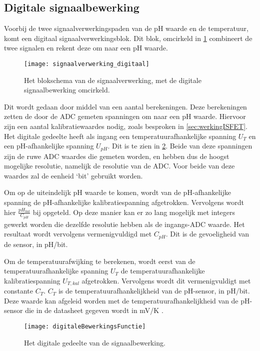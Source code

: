 \subsection{Digitale signaalbewerking}\label{sec:digitaal}

Voorbij de twee signaalverwerkingspaden van de pH waarde en de temperatuur, komt een digitaal signaalverwerkingsblok. Dit blok, omcirkeld in \cref{fig:digitaalInSchema}  combineert de twee signalen en rekent deze om naar een pH waarde.
\begin{figure}[!htbp]
    \centering
    \texttt{[image: signaalverwerking\_digitaal]}
    \caption{Het blokschema van de signaalverwerking, met de digitale signaalbewerking omcirkeld.}
    \label{fig:digitaalInSchema}
\end{figure}

Dit wordt gedaan door middel van een aantal berekeningen. Deze berekeningen zetten de door de ADC gemeten spanningen om naar een pH waarde. Hiervoor zijn een aantal kalibratiewaardes nodig, zoals besproken in \cref{sec:werkingISFET}. Het digitale gedeelte heeft als ingang een temperatuurafhankelijke spanning $U_T$ en een pH-afhankelijke spanning $U_{pH}$. Dit is te zien in \cref{fig:digitaleBewerkingsFunctie}. Beide van deze spanningen zijn de ruwe ADC waardes die gemeten worden, en hebben dus de hoogst mogelijke resolutie, namelijk de resolutie van de ADC. Voor beide van deze waardes zal de eenheid `bit' gebruikt worden.

Om op de uiteindelijk pH waarde te komen, wordt van de pH-afhankelijke spanning de pH-afhankelijke kalibratiespanning afgetrokken. Vervolgens wordt hier $\frac{pH_{kal}}{C_{pH}}$ bij opgeteld. Op deze manier kan er zo lang mogelijk met integers gewerkt worden die dezelfde resolutie hebben als de ingangs-ADC waarde. Het resultaat wordt vervolgens vermenigvuldigd met $C_{pH}$. Dit is de gevoeligheid van de sensor, in pH/bit.

Om de temperatuurafwijking te berekenen, wordt eerst van de temperatuurafhankelijke spanning $U_T$ de temperatuurafhankelijke kalibratiespanning $U_{T,kal}$ afgetrokken. Vervolgens wordt dit vermenigvuldigt met constante $C_T$. $C_T$ is de temperatuurafhankelijkheid van de pH-sensor, in pH/bit. Deze waarde kan afgeleid worden met de temperatuurafhankelijkheid van de pH-sensor die in de datasheet gegeven wordt in mV/K \cite{isfet}.

\begin{figure}[!htbp]
    \centering
    \texttt{[image: digitaleBewerkingsFunctie]}
    \caption{Het digitale gedeelte van de signaalbewerking.}
    \label{fig:digitaleBewerkingsFunctie}
\end{figure}
